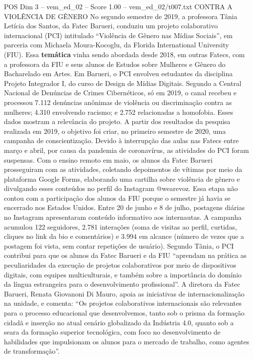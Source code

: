 \begin{textsample}{POS Dim 3 – vem\_ed\_02 – Score 1.00 – vem\_ed\_02/t007.txt}  \label{ex:f3_pos_145}
CONTRA A VIOLÊNCIA DE GÊNERO No segundo semestre de 2019, a professora Tânia Letícia dos Santos, da Fatec Barueri, conduziu um projeto colaborativo internacional (PCI) intitulado “Violência de Gênero nas Mídias Sociais”, em parceria com Michaela Moura-Kocoglu, da Florida International University (FIU).
Essa \textbf{temática} vinha sendo abordada desde 2018, em outras Fatecs, com a professora da FIU e seus alunos de Estudos sobre Mulheres e Gênero do Bacharelado em Artes.
Em Barueri, o PCI envolveu estudantes da disciplina Projeto Integrador I, do curso de Design de Mídias Digitais.
Segundo a Central Nacional de Denúncias de Crimes Cibernéticos, só em 2019, o canal recebeu e processou 7.112 denúncias anônimas de violência ou discriminação contra as mulheres; 4.310 envolvendo racismo; e 2.752 relacionadas a homofobia.
Esses dados mostram a relevância do projeto.
A partir dos resultados da pesquisa realizada em 2019, o objetivo foi criar, no primeiro semestre de 2020, uma campanha de conscientização.
Devido à interrupção das aulas nas Fatecs entre março e abril, por causa da pandemia de coronavírus, as atividades do PCI foram suspensas.
Com o ensino remoto em maio, os alunos da Fatec Barueri prosseguiram com as atividades, coletando depoimentos de vítimas por meio da plataforma Google Forms, elaborando uma cartilha sobre violência de gênero e divulgando esses conteúdos no perfil do Instagram @wearevoz.
Essa etapa não contou com a participação dos alunos da FIU porque o semestre já havia se encerrado nos Estados Unidos.
Entre 20 de junho e 8 de julho, postagens diárias no Instagram apresentaram conteúdo informativo aos internautas.
A campanha acumulou 122 seguidores, 2.781 interações (soma de visitas ao perfil, curtidas, cliques no link da bio e comentários) e 3.994 em alcance (número de vezes que a postagem foi vista, sem contar repetições de usuário).
Segundo Tânia, o PCI contribui para que os alunos da Fatec Barueri e da FIU “aprendam na prática as peculiaridades da execução de projetos colaborativos por meio de dispositivos digitais, com equipes multiculturais, e também sobre a importância do domínio da língua estrangeira para o desenvolvimento profissional”.
A diretora da Fatec Barueri, Renata Giovanoni Di Mauro, apoia as iniciativas de internacionalização na unidade, e comenta: “Os projetos colaborativos internacionais são relevantes para o processo educacional que desenvolvemos, tanto sob o prisma da formação cidadã e inserção no atual cenário globalizado da Indústria 4.0, quanto sob a seara da formação superior tecnológica, com foco no desenvolvimento de habilidades que impulsionam os alunos para o mercado de trabalho, como agentes de transformação”.

\end{textsample}
